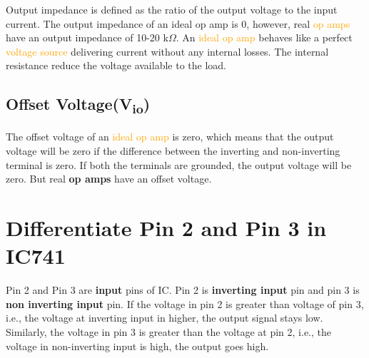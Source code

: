 \documentclass[11pt,a4paper,oneside]{article}
\begin{document}
Output impedance is defined as the ratio of the output voltage to the input current. The output impedance of an ideal op amp is 0, however, real \textcolor{orange}{op amps} have an output impedance of 10-20 k$\Omega$. An \textcolor{orange}{ideal op amp} behaves like a perfect \textcolor{orange}{voltage source} delivering current without any internal losses. The internal resistance reduce the voltage available to the load.

\subsection{Offset Voltage(V\textsubscript{io})}

The offset voltage of an \textcolor{orange}{ideal op amp} is zero, which means that the output voltage will be zero if the difference between the inverting and non-inverting terminal is zero. If both the terminals are grounded, the output voltage will be zero. But real \textbf{op amps} have an offset voltage.

\clearpage

\section{Differentiate Pin 2 and Pin 3 in IC741}

Pin 2 and Pin 3 are \textbf{input} pins of IC. Pin 2 is \textbf{inverting input} pin and pin 3 is \textbf{non inverting input} pin. If the voltage in pin 2 is greater than voltage of pin 3, i.e., the voltage at inverting input in higher, the output signal stays low. Similarly, the voltage in pin 3 is greater than the voltage at pin 2, i.e., the voltage in non-inverting input is high, the output goes high.

\clearpage
\end{document}

